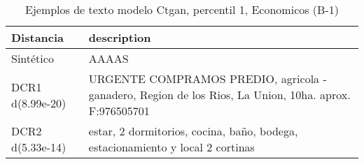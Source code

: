 \begin{table}[H]
\centering
\fontsize{10}{14}\selectfont
\caption{Ejemplos de texto modelo Ctgan, percentil 1, Economicos (B-1)}
\label{table-example-economicos-b-1-ctgan-1p-text}
\begin{tabular}{|l|m{35em}|}
\hline
\rowcolor[gray]{0.8}
Distancia & description \\
\hline Sintético & AAAAS \\
\hline DCR1 d(8.99e-20) & URGENTE COMPRAMOS PREDIO, agricola - ganadero, Region de los Rios, La Union, 10ha. aprox. F:976505701 \\
\hline DCR2 d(5.33e-14) & estar, 2 dormitorios, cocina, ba\~no, bodega, estacionamiento y local 2 cortinas \\
\hline
\end{tabular}
\end{table}
